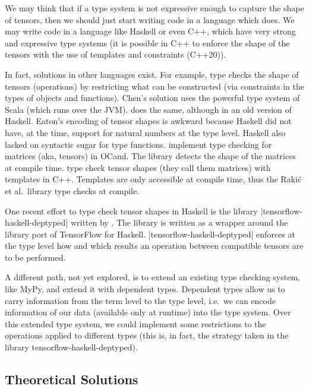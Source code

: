 We may think that if a type system is not expressive enough to capture the
shape of tensors, then we should just start writing code in a language
which does. We may write code in a language like Haskell or even C++,
which have very strong and expressive type systems (it is possible in
C++ to enforce the shape of the tensors with the use of templates and
constraints (C++20)).

In fact, solutions in other languages exist. For example,
\textcite{chen_typesafe_2017} type checks the shape of tensors
(operations) by restricting what can be constructed (via constraints in
the types of objects and functions). Chen's solution uses the powerful
type system of Scala (which runs over the JVM).
\textcite{eaton_statically_2006} does the same, although in an old
version of Haskell. Eaton's encoding of tensor shapes is awkward because
Haskell did not have, at the time, support for natural numbers at the
type level. Haskell also lacked on syntactic sugar for type functions.
\textcite{abe_simple_2015} implement type checking for matrices (aka,
tensors) in OCaml. The library detects the shape of the matrices at
compile time. \textcite{rakic_statically_2012} type check tensor shapes
(they call them matrices) with templates in C++. Templates are only
accessible at compile time, thus the Rakić et al.~library type checks at
compile.

One recent effort to type check tensor shapes in Haskell is the library
\pycode|tensorflow-haskell-deptyped| written by
\textcite{elkin_haskell_2018}. The library is written as a wrapper
around the library port of TensorFlow for Haskell.
\pycode|tensorflow-haskell-deptyped| enforces at the type level how and
which results an operation between compatible tensors are to be performed.

A different path, not yet explored, is to extend an existing type checking system, like
MyPy, and extend it with dependent types. Dependent types allow us to carry information
from the term level to the type level, i.e.~we can encode information of our data
(available only at runtime) into the type system. Over this extended type system, we could
implement some restrictions to the operations applied to different types (this is, in
fact, the strategy taken in the library tensorflow-haskell-deptyped).

\subsection{Theoretical Solutions}\label{theoretical-solutions}

